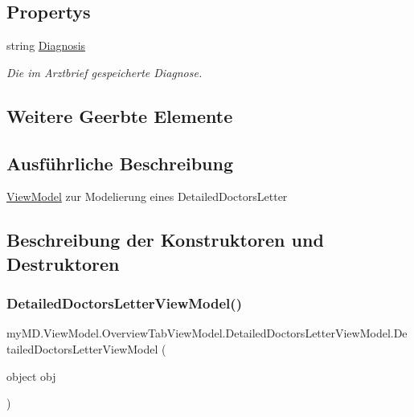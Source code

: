 \subsection*{Propertys}
\begin{DoxyCompactItemize}
\item 
string \mbox{\hyperlink{classmy_m_d_1_1_view_model_1_1_overview_tab_view_model_1_1_detailed_doctors_letter_view_model_a8a19eda5700386266c53ed6fb1f22a9c}{Diagnosis}}
\begin{DoxyCompactList}\small\item\em Die im Arztbrief gespeicherte Diagnose. \end{DoxyCompactList}\end{DoxyCompactItemize}
\subsection*{Weitere Geerbte Elemente}


\subsection{Ausführliche Beschreibung}
\mbox{\hyperlink{namespacemy_m_d_1_1_view_model}{View\+Model}} zur Modelierung eines Detailed\+Doctors\+Letter 



\subsection{Beschreibung der Konstruktoren und Destruktoren}
\mbox{\label{classmy_m_d_1_1_view_model_1_1_overview_tab_view_model_1_1_detailed_doctors_letter_view_model_a344adddfaaa08415feb4e37a8d2428f5}} 
\subsubsection{\texorpdfstring{Detailed\+Doctors\+Letter\+View\+Model()}{DetailedDoctorsLetterViewModel()}\hspace{0.1cm}{\footnotesize\ttfamily [1/2]}}
{\footnotesize\ttfamily my\+M\+D.\+View\+Model.\+Overview\+Tab\+View\+Model.\+Detailed\+Doctors\+Letter\+View\+Model.\+Detailed\+Doctors\+Letter\+View\+Model (\begin{DoxyParamCaption}\item[{object}]{obj }\end{DoxyParamCaption})}



